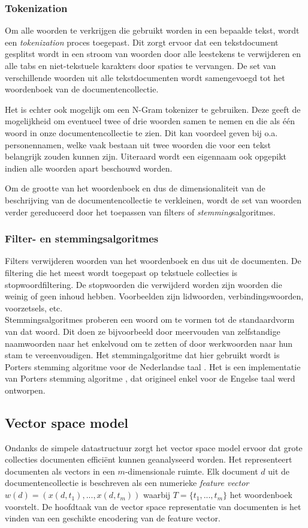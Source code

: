 \subsubsection{Tokenization}
Om alle woorden te verkrijgen die gebruikt worden in een bepaalde tekst, wordt een \textit{tokenization}\label{tokenization} proces toegepast. Dit zorgt ervoor dat een tekstdocument gesplitst wordt in een stroom van woorden door alle leestekens te verwijderen en alle tabs en niet-tekstuele karakters door spaties te vervangen. De set van verschillende woorden uit alle tekstdocumenten wordt samengevoegd tot het woordenboek van de documentencollectie. 

Het is echter ook mogelijk om een N-Gram tokenizer \cite{McNamee2004} te gebruiken. Deze geeft de mogelijkheid om eventueel twee of drie woorden samen te nemen en die als \'e\'en woord in onze documentencollectie te zien. Dit kan voordeel geven bij o.a. personennamen, welke vaak bestaan uit twee woorden die voor een tekst belangrijk zouden kunnen zijn. Uiteraard wordt een eigennaam ook opgepikt indien alle woorden apart beschouwd worden.

Om de grootte van het woordenboek en dus de dimensionaliteit van de beschrijving van de documentencollectie te verkleinen, wordt de set van woorden verder gereduceerd door het toepassen van filters of \textit{stemming}salgoritmes. 

\subsubsection{Filter- en stemmingsalgoritmes}\label{stemming}
Filters verwijderen woorden van het woordenboek en dus uit de documenten. De filtering die het meest wordt toegepast op tekstuele collecties is stopwoordfiltering. De stopwoorden die verwijderd worden zijn woorden die weinig of geen inhoud hebben. Voorbeelden zijn lidwoorden, verbindingswoorden, voorzetsels, etc. \\
Stemmingsalgoritmes proberen een woord om te vormen tot de standaardvorm van dat woord. Dit doen ze bijvoorbeeld door meervouden van zelfstandige naamwoorden naar het enkelvoud om te zetten of door werkwoorden naar hun stam te vereenvoudigen. Het stemmingalgoritme dat hier gebruikt wordt is Porters stemming algoritme voor de Nederlandse taal \cite{Kraaij1994}. Het is een implementatie van Porters stemming algoritme \cite{Porter1980}, dat origineel enkel voor de Engelse taal werd ontworpen.

\subsection{Vector space model}\label{vector-space-model}
Ondanks de simpele datastructuur zorgt het vector space model ervoor dat grote collecties documenten effici\"ent kunnen geanalyseerd worden. Het representeert documenten als vectors in een $m$-dimensionale ruimte. Elk document $d$ uit de documentencollectie is beschreven als een numerieke\textit{ feature vector} $w(d) = (x(d,t_1),...,x(d,t_m))$ waarbij $T=\{t_1,...,t_m\}$ het woordenboek voorstelt. De hoofdtaak van de vector space representatie van documenten is het vinden van een geschikte encodering van de feature vector. 

